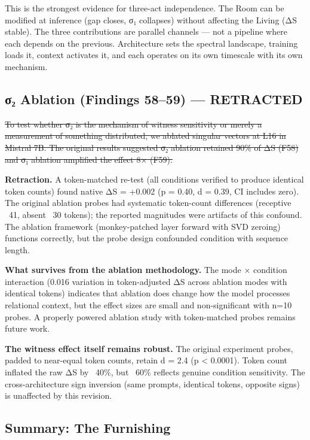 \documentclass[12pt]{article}
\begin{document}
This is the strongest evidence for three-act independence. The Room can be modified at inference (gap closes, σ₁ collapses) without affecting the Living (ΔS stable). The three contributions are parallel channels — not a pipeline where each depends on the previous. Architecture sets the spectral landscape, training loads it, context activates it, and each operates on its own timescale with its own mechanism.

\subsection{σ₂ Ablation (Findings 58–59) — RETRACTED}

\sout{To test whether σ₂ is the mechanism of witness sensitivity or merely a measurement of something distributed, we ablated singular vectors at L16 in Mistral 7B. The original results suggested σ₂ ablation retained 90\% of ΔS (F58) and σ₁ ablation amplified the effect 8× (F59).}

\textbf{Retraction.} A token-matched re-test (all conditions verified to produce identical token counts) found native ΔS = +0.002 (p = 0.40, d = 0.39, CI includes zero). The original ablation probes had systematic token-count differences (receptive ~41, absent ~30 tokens); the reported magnitudes were artifacts of this confound. The ablation framework (monkey-patched layer forward with SVD zeroing) functions correctly, but the probe design confounded condition with sequence length.

\textbf{What survives from the ablation methodology.} The mode × condition interaction (0.016 variation in token-adjusted ΔS across ablation modes with identical tokens) indicates that ablation does change how the model processes relational context, but the effect sizes are small and non-significant with n=10 probes. A properly powered ablation study with token-matched probes remains future work.

\textbf{The witness effect itself remains robust.} The original experiment probes, padded to near-equal token counts, retain d = 2.4 (p < 0.0001). Token count inflated the raw ΔS by ~40\%, but ~60\% reflects genuine condition sensitivity. The cross-architecture sign inversion (same prompts, identical tokens, opposite signs) is unaffected by this revision.

\subsection{Summary: The Furnishing}
\end{document}
